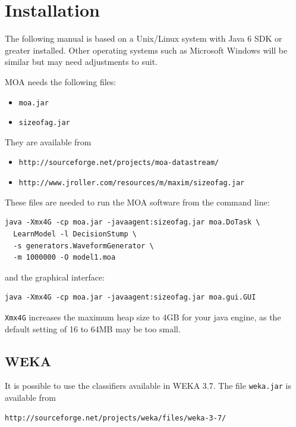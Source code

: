 \documentclass[a4paper,12pt,twoside]{book}
\begin{document}
\chapter{Installation}

The following manual is based on a Unix/Linux system with Java 6 SDK or greater installed. 
Other operating systems such as Microsoft Windows will be similar but may need adjustments to suit.

MOA needs the following files:

\begin{itemize}
\item \texttt{moa.jar}
\item \texttt{sizeofag.jar}
\end{itemize}
They are available from
\begin{itemize}
\item \texttt{http://sourceforge.net/projects/moa-datastream/}
\item \texttt{http://www.jroller.com/resources/m/maxim/sizeofag.jar}
\end{itemize}
These files are needed to run the MOA software from the command line:
\begin{verbatim}
java -Xmx4G -cp moa.jar -javaagent:sizeofag.jar moa.DoTask \
  LearnModel -l DecisionStump \
  -s generators.WaveformGenerator \
  -m 1000000 -O model1.moa
\end{verbatim}
 and the graphical interface:
\begin{verbatim}
java -Xmx4G -cp moa.jar -javaagent:sizeofag.jar moa.gui.GUI
\end{verbatim}

\texttt{Xmx4G} increases the maximum heap size to 4GB for your java engine, as
the default setting of 16 to 64MB may be too small. 


\section{WEKA}
\label{sec:InstWeka}

It is possible to use the classifiers available in WEKA 3.7. The file \texttt{weka.jar} is available from
\begin{verbatim}
http://sourceforge.net/projects/weka/files/weka-3-7/
\end{verbatim}
\end{document}
